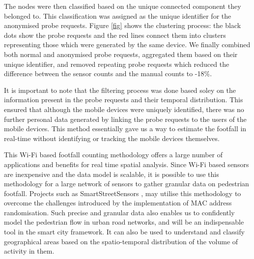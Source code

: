 \documentclass[11t, a4paper, twocolumn]{article}
\begin{document}
		The nodes were then classified based on the unique connected component they belonged to.
		This classification was assigned as the unique identifier for the anonymised probe requests.
		Figure \ref{fig} shows the clustering process: the black dots show the probe requests and the red lines connect them into clusters representing those which were generated by the same device.
		We finally combined both normal and anonymised probe requests, aggregated them based on their unique identifier, and removed repeating probe requests which reduced the difference between the sensor counts and the manual counts to -18\%.

		It is important to note that the filtering process was done based soley on the information present in the probe requests and their temporal distribution.
		This ensured that although the mobile devices were uniquely identified, there was no further personal data generated by linking the probe requests to the users of the mobile devices.
		This method essentially gave us a way to estimate the footfall in real-time without identifying or tracking the mobile devices themselves.

		This Wi-Fi based footfall counting methodology offers a large number of applications and benefits for real time spatial analysis.
		Since Wi-Fi based sensors are inexpensive and the data model is scalable, it is possible to use this methodology for a large network of sensors to gather granular data on pedestrian footfall.
		Projects such as SmartStreetSensors \citep{sss2016}, may utilise this methodology to overcome the challenges introduced by the implementation of MAC address randomisation.
		Such precise and granular data also enables us to confidently model the pedestrian flow in urban road networks, and will be an indispensable tool in the smart city framework.
		It can also be used to understand and classify geographical areas based on the spatio-temporal distribution of the volume of activity in them.

	\printbibliography[title={References}]
\end{document}

